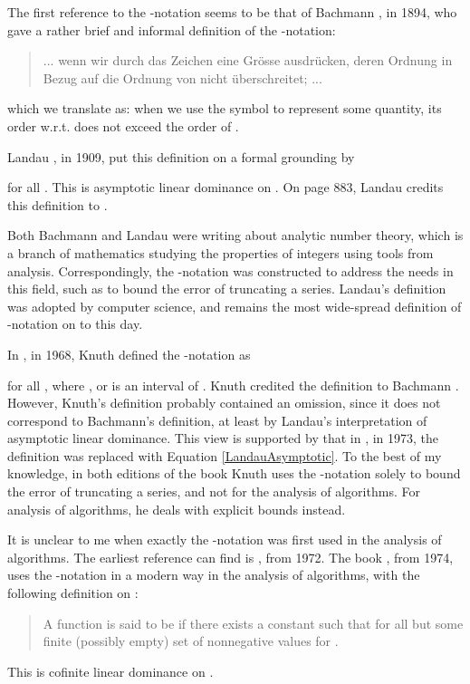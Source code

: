 \documentclass[b5paper, english, oneside]{memoir}
\begin{document}
The first reference to the -notation seems to be that of Bachmann \cite[page 401]{BachmannOh}, in 1894, who gave a rather brief and informal definition of the -notation:
\begin{quote}
... wenn wir durch das Zeichen  eine Gr\"osse ausdr\"ucken, deren Ordnung in Bezug auf  die Ordnung von  nicht \"uberschreitet; ...
\end{quote}
which we translate as: when we use the symbol  to represent some quantity, its order w.r.t.  does not exceed the order of . 

Landau \cite[page 31]{SmallOh}, in 1909, put this definition on a formal grounding by

for all . This is asymptotic linear dominance on . On page 883, Landau credits this definition to \cite{BachmannOh}. 

Both Bachmann and Landau were writing about analytic number theory, which is a branch of mathematics studying the properties of integers using tools from analysis. Correspondingly, the -notation was constructed to address the needs in this field, such as to bound the error of truncating a series. Landau's definition was adopted by computer science, and remains the most wide-spread definition of -notation on  to this day.

In \cite{ArtOfProgrammingVol1Ed1}, in 1968, Knuth defined the -notation as

for all , where , or  is an interval of . Knuth credited the definition to Bachmann \cite{BachmannOh}. However, Knuth's definition probably contained an omission, since it does not correspond to Bachmann's definition, at least by Landau's interpretation of asymptotic linear dominance. This view is supported by that in \cite{ArtOfProgrammingVol1Ed2}, in 1973, the definition was replaced with Equation \ref{LandauAsymptotic}. To the best of my knowledge, in both editions of the book Knuth uses the -notation solely to bound the error of truncating a series, and not for the analysis of algorithms. For analysis of algorithms, he deals with explicit bounds instead.



It is unclear to me when exactly the -notation was first used in the analysis of algorithms. The earliest reference \we{} can find is \cite{EarlyONotation}, from 1972. The book \cite{DesignAndAnalysisOfComputerAlgorithms}, from 1974, uses the -notation in a modern way in the analysis of algorithms, with the following definition on :
\begin{quotation}
A function  is said to be  if there exists a constant  such that  for all but some finite (possibly empty) set of nonnegative values for .
\end{quotation}
This is cofinite linear dominance on . 
\end{document}
